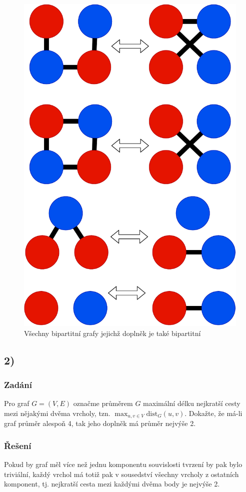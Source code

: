 \documentclass[../main.tex]{subfiles}
\begin{document}
\begin{figure}[!h]
    \centering
    \includegraphics[height=\linewidth]{images/BipartiteComplement.pdf}
    \caption*{Všechny bipartitní grafy jejichž doplněk je také bipartitní}
\end{figure}






\subsection{2)}
\subsubsection*{Zadání}
Pro graf $G=(V,E)$ označme průměrem $G$ maximální délku nejkratší cesty mezi nějakými dvěma vrcholy, tzn. $\max_{u,v\in V} \text{dist}_{G}(u,v)$. Dokažte, že má-li graf průměr alespoň 4, tak jeho doplněk má průměr nejvýše 2.

\subsubsection*{Řešení}

Pokud by graf měl více než jednu komponentu souvislosti tvrzení by pak bylo triviální, každý vrchol má totiž pak v sousedství všechny vrcholy z ostatních komponent, tj. nejkratší cesta mezi každými dvěma body je nejvýše 2.
\end{document}
